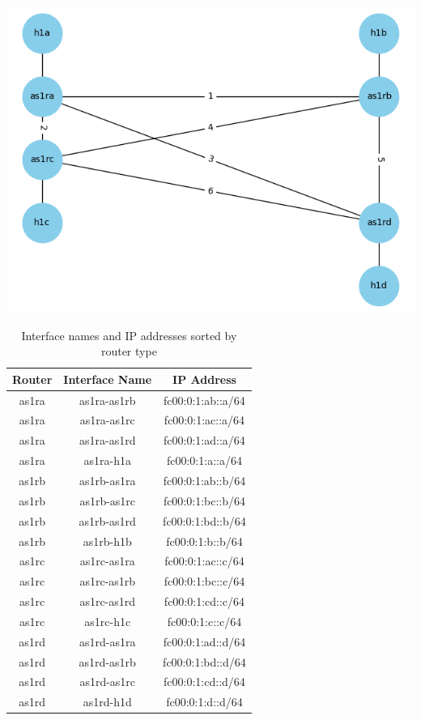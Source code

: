 \includegraphics{Lab4/graphics/ospf_topology.png}

\begin{table}[h!]
\centering
\begin{tabular}{|c|c|c|}
\hline
\textbf{Router} & \textbf{Interface Name} & \textbf{IP Address} \\
\hline
as1ra & as1ra-as1rb & fc00:0:1:ab::a/64 \\
\hline
as1ra & as1ra-as1rc & fc00:0:1:ac::a/64 \\
\hline
as1ra & as1ra-as1rd & fc00:0:1:ad::a/64 \\
\hline
as1ra & as1ra-h1a & fc00:0:1:a::a/64 \\
\hline
as1rb & as1rb-as1ra & fc00:0:1:ab::b/64 \\
\hline
as1rb & as1rb-as1rc & fc00:0:1:bc::b/64 \\
\hline
as1rb & as1rb-as1rd & fc00:0:1:bd::b/64 \\
\hline
as1rb & as1rb-h1b & fc00:0:1:b::b/64 \\
\hline
as1rc & as1rc-as1ra & fc00:0:1:ac::c/64 \\
\hline
as1rc & as1rc-as1rb & fc00:0:1:bc::c/64 \\
\hline
as1rc & as1rc-as1rd & fc00:0:1:cd::c/64 \\
\hline
as1rc & as1rc-h1c & fc00:0:1:c::c/64 \\
\hline
as1rd & as1rd-as1ra & fc00:0:1:ad::d/64 \\
\hline
as1rd & as1rd-as1rb & fc00:0:1:bd::d/64 \\
\hline
as1rd & as1rd-as1rc & fc00:0:1:cd::d/64 \\
\hline
as1rd & as1rd-h1d & fc00:0:1:d::d/64 \\
\hline
\end{tabular}
\caption{Interface names and IP addresses sorted by router type}
\label{table:sorted_interfaces}
\end{table}
